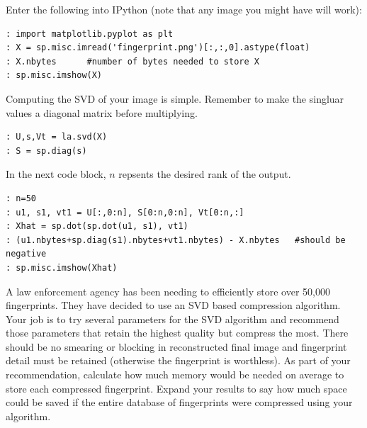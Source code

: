 \begin{python}
Enter the following into IPython (note that any image you might have will work):
\begin{lstlisting}
: import matplotlib.pyplot as plt
: X = sp.misc.imread('fingerprint.png')[:,:,0].astype(float)
: X.nbytes      #number of bytes needed to store X
: sp.misc.imshow(X)
\end{lstlisting}
Computing the SVD of your image is simple.  Remember to make the singluar values a diagonal matrix before multiplying.
\begin{lstlisting}
: U,s,Vt = la.svd(X)
: S = sp.diag(s)
\end{lstlisting}
In the next code block, $n$ repsents the desired rank of the output.
\begin{lstlisting}
: n=50
: u1, s1, vt1 = U[:,0:n], S[0:n,0:n], Vt[0:n,:]
: Xhat = sp.dot(sp.dot(u1, s1), vt1)
: (u1.nbytes+sp.diag(s1).nbytes+vt1.nbytes) - X.nbytes   #should be negative
: sp.misc.imshow(Xhat)
\end{lstlisting}

\begin{problem}
A law enforcement agency has been needing to efficiently store over 50,000 fingerprints.  They have decided to use an SVD based compression algorithm.  Your job is to try several parameters for the SVD algorithm and recommend those parameters that retain the highest quality but compress the most.  There should be no smearing or blocking in reconstructed final image and fingerprint detail must be retained (otherwise the fingerprint is worthless).  As part of your recommendation, calculate how much memory would be needed on average to store each compressed fingerprint.  Expand your results to say how much space could be saved if the entire database of fingerprints were compressed using your algorithm.
\end{problem}
\end{python}
